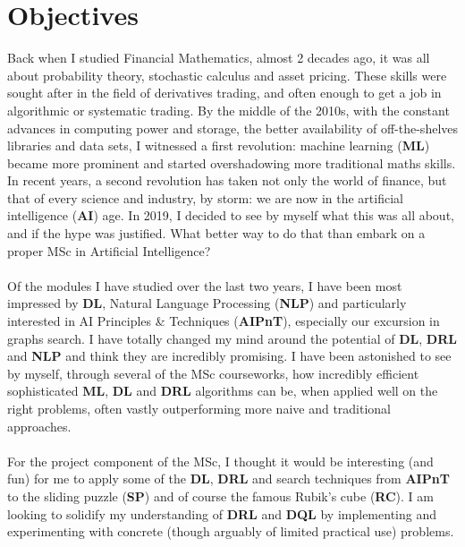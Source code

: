 
\chapter{Objectives} %

\label{Chapter0} %



Back when I studied Financial Mathematics, almost 2 decades ago, it was all about probability theory, stochastic calculus and asset pricing. These skills were sought after in the field of derivatives trading, and often enough to get a job in algorithmic or systematic trading. By the middle of the 2010s, with the constant advances in computing power and storage, the better availability of off-the-shelves libraries and data sets, I witnessed a first revolution: machine learning (\textbf{ML}) became more prominent and started overshadowing more traditional maths skills. In recent years, a second revolution has taken not only the world of finance, but that of every science and industry, by storm: we are now in the artificial intelligence (\textbf{AI}) age. In 2019, I decided to see by myself what this was all about, and if the hype was justified. What better way to do that than embark on a proper MSc in Artificial Intelligence?
\\
\\
Of the modules I have studied over the last two years, I have been most impressed by \textbf{DL},  Natural Language Processing (\textbf{NLP}) and particularly interested in AI Principles \& Techniques (\textbf{AIPnT}), especially our excursion in graphs search. I have totally changed my mind around the potential of \textbf{DL}, \textbf{DRL} and \textbf{NLP} and think they are incredibly promising. I have been astonished to see by myself, through several of the MSc courseworks, how incredibly efficient sophisticated \textbf{ML}, \textbf{DL} and \textbf{DRL} algorithms can be, when applied well on the right problems, often vastly outperforming more naive and traditional approaches.
\\
\\
For the project component of the MSc, I thought it would be interesting (and fun) for me to apply some of the \textbf{DL}, \textbf{DRL} and search techniques from \textbf{AIPnT} to the sliding puzzle (\textbf{SP}) and of course the famous Rubik's cube (\textbf{RC}). I am looking to solidify my understanding of \textbf{DRL} and \textbf{DQL} by  implementing and experimenting with concrete (though arguably of limited practical use) problems.

